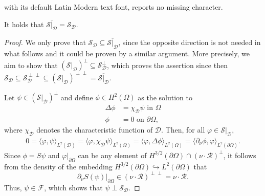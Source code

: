 \documentclass[10pt,a4paper]{amsart}
\newcommand{\D}{\mathcal{D}}
\newcommand{\inner}[1]{\langle#1\rangle}
\begin{document}
with its default Latin Modern text font, reports no missing character.
\begin{lem} \label{lem_S_D}
	It holds that $\overline{\mathcal{S}|_{\D}} = \mathcal{S}_{\D}$.
\end{lem}

\begin{proof}
	We only prove that $\mathcal{S}_{\D} \subseteq \overline{\mathcal{S}|_{\D}}$, since the opposite direction is not needed in what follows and it could be proven by a similar argument. More precisely, we aim to show that $(\mathcal{S}|_{\D})^{\perp} \subseteq \mathcal{S}_{\D}^\perp$, which proves the assertion since then $\mathcal{S}_{\D} \subseteq \mathcal{S}_{\D}^{\perp \perp} \subseteq (\mathcal{S}|_{\D})^{\perp \perp} = \overline{ \mathcal{S}|_{\D}}$.
	
	Let $\psi \in (\mathcal{S}|_{\D})^\perp$ and define $\phi \in H^2(\Omega)$ as the solution to
	\begin{align*} 
		\Delta\phi &= \chi_{\D} \psi \text{ in } \Omega\\
		\phi &= 0 \text{ on } \partial\Omega,
	\end{align*}
	where $\chi_{\D}$ denotes the characteristic function of $\D$. Then, for all $\varphi \in \mathcal{S}|_{\D}$,
	\begin{align*}
		0 = \inner{\varphi,\psi}_{L^2(\D)} = \inner{\varphi,\chi_{\D} \psi}_{L^2(\Omega)} = \inner{\varphi,\Delta \phi}_{L^2(\Omega)} = \inner{\partial_\nu \phi, \varphi}_{L^2(\partial\Omega)}.
	\end{align*}
	Since $\phi = S\psi$ and  $\varphi|_{\partial\Omega}$ can be any element of $H^{3/2}(\partial \Omega) \cap (\nu \cdot \mathcal{R})^\perp$, it follows from the density of the embedding $H^{3/2}(\partial \Omega) \hookrightarrow L^2(\partial \Omega)$ that 
	\begin{equation*}
		\partial_\nu S(\psi)|_{\partial\Omega} \in (\nu \cdot \mathcal{R})^{\perp \perp} = \nu \cdot \mathcal{R}.
	\end{equation*}
	Thus, $\psi \in \mathcal F$, which shows that $\psi \perp \mathcal{S}_{\D}$.
\end{proof}
\end{document}

